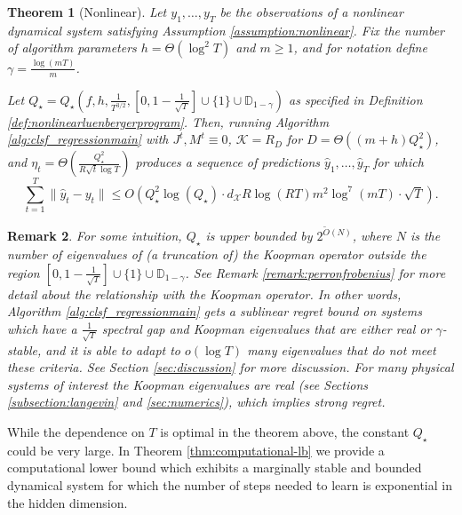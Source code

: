 \documentclass[11pt]{article}
\newtheorem{theorem}{Theorem}[section]
\newtheorem{remark}[theorem]{Remark}
\numberwithin{equation}{section}
\begin{document}
\begin{theorem}[Nonlinear]
    \label{theorem:main_nonlinear}
    Let $y_1, \ldots, y_T$ be the observations of a nonlinear dynamical system satisfying Assumption \ref{assumption:nonlinear}. Fix the number of algorithm parameters $h = \Theta(\log^2T)$ and $m \geq 1$, and for notation define $\gamma = \frac{\log(mT)}{m}$. 
    
  Let $Q_\star = Q_\star\left(f,h,\frac{1}{T^{3/2}}, \left[0, 1 - \frac{1}{\sqrt{T}}\right] \cup \{1\} \cup \mathbb{D}_{1-\gamma}\right)$ as specified in Definition \ref{def:nonlinearluenbergerprogram}.
    Then, running Algorithm \ref{alg:clsf_regressionmain} with $J^t, M^t \equiv 0$, $\mathcal{K} = R_D$ for $D = \Theta((m+h)Q_\star^2)$, and  $\eta_t = \Theta\left(\frac{Q_\star^2}{R\sqrt{t}\log T}\right)$ produces a sequence of predictions $\hat{y}_1, \ldots, \hat{y}_T$ for which
    $$\sum_{t=1}^T \|\hat{y}_t - y_t\| \leq O\left(Q_\star^2 \log(Q_\star) \cdot d_\mathcal{X} R \log(RT) m^2 \log^7(mT)  \cdot \sqrt{T}\right)  . $$
\end{theorem}
\begin{remark}
    For some intuition, $Q_\star$ is upper bounded by $2^{\widetilde{O}(N)}$, where $N$ is the number of eigenvalues of (a truncation of) the Koopman operator outside the region $\left[0, 1 - \frac{1}{\sqrt{T}}\right] \cup \{1\} \cup \mathbb{D}_{1-\gamma}$. See Remark \ref{remark:perronfrobenius} for more detail about the relationship with the Koopman operator. In other words, Algorithm \ref{alg:clsf_regressionmain} gets a sublinear regret bound on systems which have a $\frac{1}{\sqrt{T}}$ spectral gap and Koopman eigenvalues that are either real or $\gamma$-stable, and it is able to adapt to $o(\log T)$ many eigenvalues that do not meet these criteria. See Section \ref{sec:discussion} for more discussion. For many physical systems of interest the Koopman eigenvalues are real (see Sections \ref{subsection:langevin} and \ref{sec:numerics}), which implies strong regret.
\end{remark}

While the dependence on $T$ is optimal in the theorem above, the constant $Q_\star$ could be very large. 
In Theorem \ref{thm:computational-lb} we provide a computational lower bound which exhibits a marginally stable and bounded dynamical system for which the number of steps needed to learn is exponential in the hidden dimension. 
\end{document}
